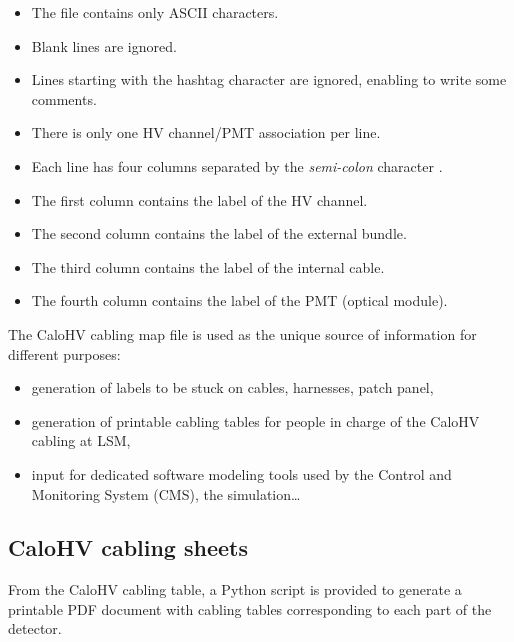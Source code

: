 \begin{itemize}
\item The file contains only ASCII characters.
\item Blank lines are ignored.
\item Lines starting with the hashtag character \fbox{\texttt{\#}} are
  ignored, enabling to write some comments.
\item There is only one HV channel/PMT association per line.
\item Each  line has  four columns  separated by  the \emph{semi-colon}
  character \fbox{\texttt{;}}.
\item The first column contains the label of the HV channel.
\item The second column contains the label of the external bundle.
\item The third column contains the label of the internal cable.
\item The fourth column contains the label of the PMT (optical module).
\end{itemize}

\par\noindent The  CaloHV cabling  map file  is  used as  the unique
source of information for different purposes:
\begin{itemize}
\item generation of labels to be stuck on cables, harnesses, patch panel,
\item generation of  printable cabling tables for people in charge  of the CaloHV
  cabling at LSM,
\item input for dedicated software  modeling tools used by the
  Control and Monitoring System (CMS), the simulation\dots 
\end{itemize}


\subsection{CaloHV cabling sheets}


From  the CaloHV  cabling  table, a  Python script  is provided  to
generate a printable PDF document with cabling tables corresponding to
each  part of  the  detector.





